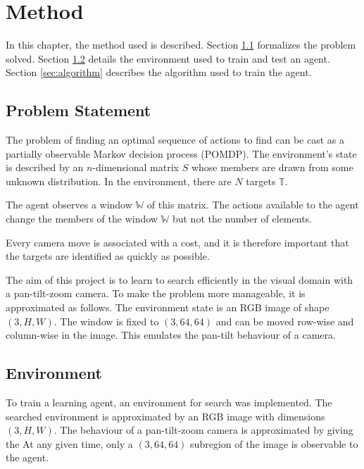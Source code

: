 \chapter{Method}
\label{cha:method}

In this chapter, the method used is described. Section \ref{sec:problem} formalizes the problem solved. Section \ref{sec:environment} details the environment used to train and test an agent. Section \ref{sec:algorithm} describes the algorithm used to train the agent.

\section{Problem Statement}
\label{sec:problem}

The problem of finding an optimal sequence of actions to find can be cast as a partially observable Markov decision process (POMDP). The environment's state is described by an \(n\)-dimensional matrix \(S\) whose members are drawn from some unknown distribution. In the environment, there are \(N\) targets \(\mathbb{T}\).

The agent observes a window \(\mathbb{W}\) of this matrix. The actions available to the agent change the members of the window \(\mathbb{W}\) but not the number of elements.

Every camera move is associated with a cost, and it is therefore important that the targets are identified as quickly as possible. %

The aim of this project is to learn to search efficiently in the visual domain with a pan-tilt-zoom camera. To make the problem more manageable, it is approximated as follows. The environment state is an RGB image of shape \((3, H, W)\). The window is fixed to \((3, 64, 64)\) and can be moved row-wise and column-wise in the image. This emulates the pan-tilt behaviour of a camera.



\section{Environment}
\label{sec:environment}

To train a learning agent, an environment for search was implemented. The searched environment is approximated by an RGB image with dimensions \((3, H, W)\). The behaviour of a pan-tilt-zoom camera is approximated by giving the   At any given time, only a \((3, 64, 64)\) subregion of the image is observable to the agent.

